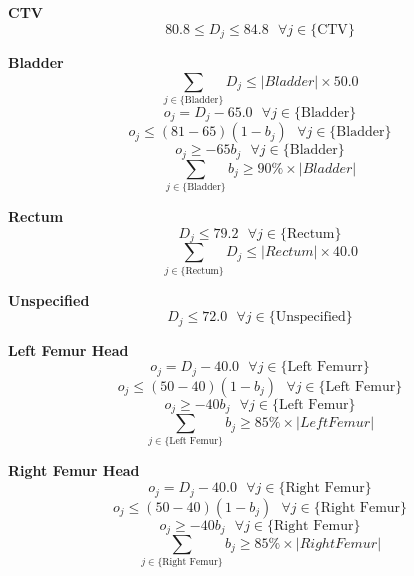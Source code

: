 \documentclass{report}
\begin{document}
\textbf{CTV}
\begin{equation}
    80.8 \leq D_j \leq 84.8 ~~~ \forall j \in \{\text{CTV} \}
\end{equation}

\textbf{Bladder}
\begin{equation}
    \sum_{j \in \{\text{Bladder} \}}D_j \leq |Bladder| \times 50.0
\end{equation}
\begin{equation}
    o_j = D_j - 65.0 ~~~ \forall j \in \{\text{Bladder} \}
\end{equation}
\begin{equation}
    o_j \leq (81-65)(1 - b_j) ~~~ \forall j \in \{\text{Bladder} \}
\end{equation}
\begin{equation}
    o_j \geq -65b_j ~~~ \forall j \in \{\text{Bladder} \}
\end{equation}
\begin{equation}
    \sum_{j \in  \{\text{Bladder} \}}b_j \geq 90\% \times |Bladder|
\end{equation}

\textbf{Rectum}
\begin{equation}
    D_j \leq 79.2 ~~~ \forall j \in \{\text{Rectum} \}
\end{equation}
\begin{equation}
    \sum_{j \in \{\text{Rectum} \}}D_j \leq |Rectum| \times 40.0
\end{equation}

\textbf{Unspecified}
\begin{equation}
    D_j \leq 72.0 ~~~ \forall j \in \{\text{Unspecified} \}
\end{equation}

\textbf{Left Femur Head}
\begin{equation}
    o_j = D_j - 40.0 ~~~ \forall j \in \{\text{Left Femurr} \}
\end{equation}
\begin{equation}
    o_j \leq (50-40)(1 - b_j) ~~~ \forall j \in \{\text{Left Femur} \}
\end{equation}
\begin{equation}
    o_j \geq -40b_j ~~~ \forall j \in \{\text{Left Femur} \}
 \end{equation}
\begin{equation}
    \sum_{j \in \{\text{Left Femur} \}}b_j \geq 85\% \times |Left Femur|
\end{equation}

\textbf{Right Femur Head}
\begin{equation}
    o_j = D_j - 40.0 ~~~ \forall j \in \{\text{Right Femur} \}
\end{equation}
\begin{equation}
    o_j \leq (50-40)(1 - b_j) ~~~ \forall j \in \{\text{Right Femur} \}
\end{equation}
\begin{equation}
    o_j \geq -40b_j ~~~ \forall j \in \{\text{Right Femur} \}
 \end{equation}
\begin{equation}
    \sum_{j \in \{\text{Right Femur} \}}b_j \geq 85\% \times |Right Femur|
\end{equation}
\end{document}
